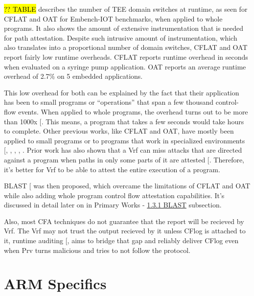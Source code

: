 \documentclass[a4paper, nobind]{templates/ociamthesis}
\begin{document}
\hl{?? TABLE} describes the number of TEE domain switches at runtime,
as seen for CFLAT and OAT for Embench-IOT benchmarks, when applied to whole programs.
It also shows the amount of extensive instrumentation that is needed for path attestation.
Despite such intrusive amount of instrumentation, which also translates into
a proportional number of domain switches, CFLAT and OAT report fairly low runtime overheads.
CFLAT reports runtime overhead in seconds when evaluated on a syringe pump application.
OAT reports an average runtime overhead of 2.7\% on 5 embedded applications.

This low overhead for both can be explained by the fact that their application
has been to small programs or ``operations'' that span a few thousand control-flow events.
When applied to whole programs, the overhead turns out to be more than 1000x {[}\citeproc{ref-blast}{56}{]}.
This means, a program that takes a few seconds would take hours to complete.
Other previous works, like CFLAT and OAT, have mostly been applied to small
programs or to programs that work in specialized environments {[}, , , , \citeproc{ref-blast}{56}{]}.
Prior work has also shown that a Vrf can miss attacks that are directed against
a program when paths in only some parts of it are attested {[}\citeproc{ref-hu2019probability}{29}{]}.
Therefore, it's better for Vrf to be able to attest the entire execution of a program.

BLAST {[}\citeproc{ref-blast}{56}{]} was then proposed, which overcame the limitations of CFLAT and OAT while
also adding whole program control flow attestation capabilities. It's discussed
in detail later on in Primary Works - \hyperref[blast]{1.3.1 BLAST} subsection.

Also, most CFA techniques do not guarantee that the report will be recieved by Vrf.
The Vrf may not trust the output recieved by it unless CFlog is attached to it,
runtime auditing {[}, \citeproc{ref-caulfield2023acfa}{20}{]} aims to bridge that
gap and reliably deliver CFlog even when Prv turns malicious and tries to not
follow the protocol.

\section{ARM Specifics}\label{arm-specifics}
\end{document}
